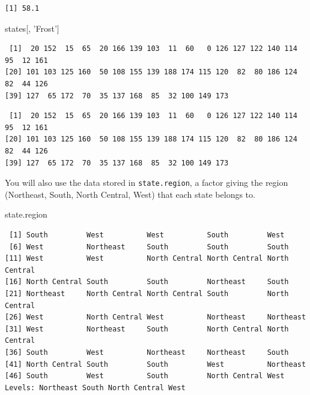 \documentclass[
]{book}
\newenvironment{Shaded}{\begin{snugshade}}{\end{snugshade}}
\newcommand{\NormalTok}[1]{#1}
\newcommand{\OperatorTok}[1]{\textcolor[rgb]{0.81,0.36,0.00}{\textbf{#1}}}
\newcommand{\StringTok}[1]{\textcolor[rgb]{0.31,0.60,0.02}{#1}}
\begin{document}
\begin{verbatim}
[1] 58.1
\end{verbatim}

\begin{Shaded}
\begin{Highlighting}[]
\NormalTok{states[, }\StringTok{'Frost'}\NormalTok{] }
\end{Highlighting}
\end{Shaded}

\begin{verbatim}
 [1]  20 152  15  65  20 166 139 103  11  60   0 126 127 122 140 114  95  12 161
[20] 101 103 125 160  50 108 155 139 188 174 115 120  82  80 186 124  82  44 126
[39] 127  65 172  70  35 137 168  85  32 100 149 173
\end{verbatim}

\begin{Shaded}
\end{Shaded}

\begin{verbatim}
 [1]  20 152  15  65  20 166 139 103  11  60   0 126 127 122 140 114  95  12 161
[20] 101 103 125 160  50 108 155 139 188 174 115 120  82  80 186 124  82  44 126
[39] 127  65 172  70  35 137 168  85  32 100 149 173
\end{verbatim}

You will also use the data stored in \texttt{state.region}, a factor giving the region (Northeast, South, North Central, West) that each state belongs to.

\begin{Shaded}
\begin{Highlighting}[]
\NormalTok{state.region}
\end{Highlighting}
\end{Shaded}

\begin{verbatim}
 [1] South         West          West          South         West         
 [6] West          Northeast     South         South         South        
[11] West          West          North Central North Central North Central
[16] North Central South         South         Northeast     South        
[21] Northeast     North Central North Central South         North Central
[26] West          North Central West          Northeast     Northeast    
[31] West          Northeast     South         North Central North Central
[36] South         West          Northeast     Northeast     South        
[41] North Central South         South         West          Northeast    
[46] South         West          South         North Central West         
Levels: Northeast South North Central West
\end{verbatim}
\end{document}
